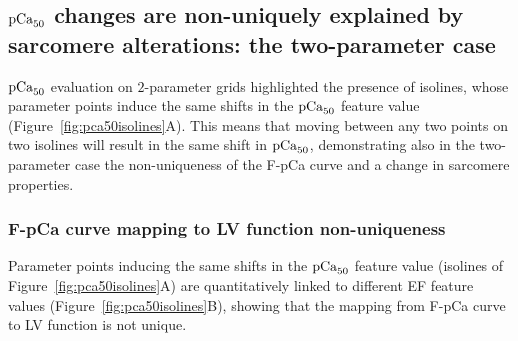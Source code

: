 %
%
%
\subsection{$\textrm{pCa}_{50}$ changes are non-uniquely explained by sarcomere alterations: the two-parameter case}\label{sec:changespCa50result2}
$\textrm{pCa}_{50}$ evaluation on $2$-parameter grids highlighted the presence of isolines, whose parameter points induce the same shifts in the $\textrm{pCa}_{50}$ feature value (Figure~\ref{fig:pca50isolines}A). This means that moving between any two points on two isolines will result in the same shift in $\textrm{pCa}_{50}$, demonstrating also in the two-parameter case the non-uniqueness of the F-pCa curve and a change in sarcomere properties.


%
%
%
\subsubsection{F-pCa curve mapping to LV function non-uniqueness}\label{sec:fpcatolvnonuniquemapping}
Parameter points inducing the same shifts in the $\textrm{pCa}_{50}$ feature value (isolines of Figure~\ref{fig:pca50isolines}A) are quantitatively linked to different EF feature values (Figure~\ref{fig:pca50isolines}B), showing that the mapping from F-pCa curve to LV function is not unique.

